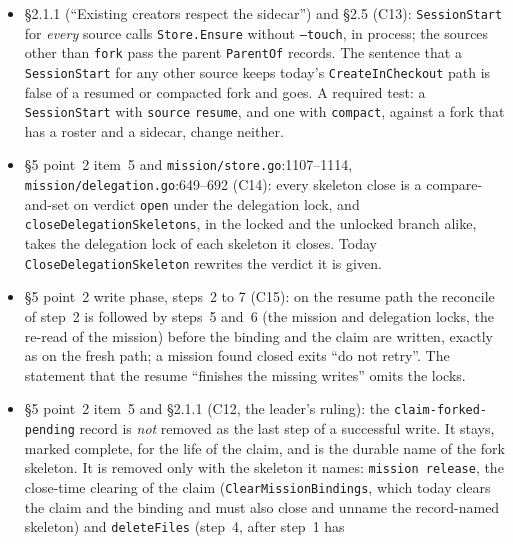 \documentclass[a4paper,10pt,fleqn]{article}
\newcommand{\fpath}[1]{\texttt{#1}}
\newcommand{\field}[1]{\texttt{#1}}
\begin{document}
\begin{itemize}
    that does not resume the record'' is withdrawn; the clause applies on the
    two write-proceeding reconcile paths (fresh and resume), with or without a
    record, and never on a refusal or the claimed case. The trace is no longer
    ``completed propagation, release, second propagation'', since release
    clears the binding; it is a close-time clearing of another mission
    (\texttt{C9\_nosup}).
  \item \S2.1.1 (``Existing creators respect the sidecar'') and \S2.5 (C13):
    \field{SessionStart} for \emph{every} source calls \field{Store.Ensure}
    without \field{--touch}, in process; the sources other than \field{fork}
    pass the parent \field{ParentOf} records. The sentence that a
    \field{SessionStart} for any other source keeps today's
    \field{CreateInCheckout} path is false of a resumed or compacted fork and
    goes. A required test: a \field{SessionStart} with \field{source}
    \texttt{resume}, and one with \texttt{compact}, against a fork that has a
    roster and a sidecar, change neither.
  \item \S5 point~2 item~5 and \fpath{mission/store.go}:1107--1114,
    \fpath{mission/delegation.go}:649--692 (C14): every skeleton close is a
    compare-and-set on verdict \field{open} under the delegation lock, and
    \field{closeDelegationSkeletons}, in the locked and the unlocked branch
    alike, takes the delegation lock of each skeleton it closes. Today
    \field{CloseDelegationSkeleton} rewrites the verdict it is given.
  \item \S5 point~2 write phase, steps~2 to 7 (C15): on the resume path the
    reconcile of step~2 is followed by steps~5 and~6 (the mission and
    delegation locks, the re-read of the mission) before the binding and the
    claim are written, exactly as on the fresh path; a mission found closed
    exits ``do not retry''. The statement that the resume ``finishes the
    missing writes'' omits the locks.
  \item \S5 point~2 item~5 and \S2.1.1 (C12, the leader's ruling): the
    \field{claim-forked-pending} record is \emph{not} removed as the last step
    of a successful write. It stays, marked complete, for the life of the
    claim, and is the durable name of the fork skeleton. It is removed only
    with the skeleton it names: \field{mission release}, the close-time
    clearing of the claim (\field{ClearMissionBindings}, which today clears
    the claim and the binding and must also close and unname the
    record-named skeleton) and \field{deleteFiles} (step~4, after step~1 has

\end{itemize}
\end{document}
